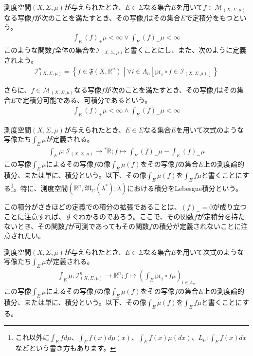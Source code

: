\documentclass[dvipdfmx]{jsarticle}
\begin{document}
\begin{dfn}
測度空間$(X,\varSigma,\mu)$が与えられたとき、$E \in \varSigma$なる集合$E$を用いて$f \in \mathcal{M}_{(X,\varSigma,\mu)}$なる写像$f$が次のことを満たすとき、その写像$f$はその集合$E$で定積分をもつという。
\begin{align*}
\int_{E} {(f)_{+}\mu} < \infty \vee \int_{E} {(f)_{-}\mu} < \infty
\end{align*}
このような関数$f$全体の集合を$\mathcal{I}_{(X,\varSigma,\mu)}$と書くことにし、また、次のように定義されよう。
\begin{align*}
\mathcal{I}_{(X,\varSigma,\mu)}^{n} = \left\{ f \in \mathfrak{F}\left( X,\mathbb{R}^{n} \right) \middle| \forall i \in \varLambda_{n}\left[ \mathrm{pr}_{i} \circ f \in \mathcal{I}_{(X,\varSigma,\mu)} \right] \right\}
\end{align*}\par
さらに、$f \in \mathcal{M}_{(X,\varSigma,\mu)}$なる写像$f$が次のことを満たすとき、その写像$f$はその集合$E$で定積分可能である、可積分であるという。
\begin{align*}
\int_{E} {(f)_{+}\mu} < \infty \land \int_{E} {(f)_{-}\mu} < \infty
\end{align*}
\end{dfn}
\begin{dfn}
測度空間$(X,\varSigma,\mu)$が与えられたとき、$E \in \varSigma$なる集合$E$を用いて次式のような写像たち$\int_{E} \mu$が定義される。
\begin{align*}
\int_{E} \mu:\mathcal{I}_{(X,\varSigma,\mu)} \rightarrow{}^{*}\mathbb{R};f \mapsto \int_{E} {(f)_{+}\mu} - \int_{E} {(f)_{-}\mu}
\end{align*}
この写像$\int_{E} \mu$によるその写像$f$の像$\int_{E} \mu(f)$をその写像$f$の集合$E$上の測度論的積分、または単に、積分という。以下、その像$\int_{E} \mu(f)$を$\int_{E} {f\mu}$と書くことにする\footnote{これ以外に$\int_{E} {fd\mu}$、$\int_{E} {f(x)d\mu(x)}$、$\int_{E} {f(x)\mu(dx)}$、$L_{\mu}:\int_{E} {f(x)dx}$などという書き方もあります。}。特に、測度空間$\left( \mathbb{R}^{n},\mathfrak{M}_{C}\left( \lambda^{*} \right),\lambda \right)$における積分をLebesgue積分という。
\end{dfn}\par
この積分がさきほどの定義での積分の拡張であることは、$(f)_{-} = 0$が成り立つことに注意すれば、すぐわかるのであろう。ここで、その関数$f$が定積分を持たないとき、その関数$f$が可測であってもその関数$f$の積分が定義されないことに注意されたい。
\begin{dfn}
測度空間$(X,\varSigma,\mu)$が与えられたとき、$E \in \varSigma$なる集合$E$を用いて次式のような写像たち$\int_{E} \mu$が定義される。
\begin{align*}
\int_{E} \mu:\mathcal{I}_{(X,\varSigma,\mu)}^{n} \rightarrow \mathbb{R}^{n};f \mapsto \left( \int_{E} {\mathrm{pr}_{i} \circ f\mu} \right)_{i \in \varLambda_{n}}
\end{align*}
この写像$\int_{E} \mu$によるその写像$f$の像$\int_{E} \mu(f)$をその写像$f$の集合$E$上の測度論的積分、または単に、積分という。以下、その像$\int_{E} \mu(f)$を$\int_{E} {f\mu}$と書くことにする。
\end{dfn}
\end{document}
